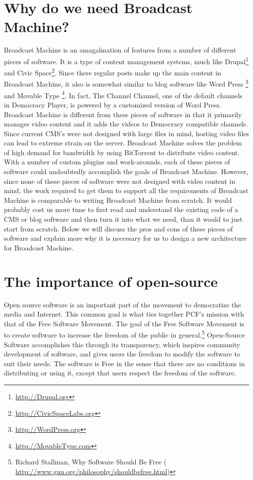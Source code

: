 \documentclass[a4paper,12pt]{report}
\begin{document}
\section {Why do we need Broadcast Machine?}
    Broadcast Machine is an amagalmation of features from a number of different pieces of software.
It is a type of content management systems, much like Drupal\footnote{\url{http://Drupal.org}} and Civic Space\footnote{\url{http://CivicSpaceLabs.org} }.
Since there regular posts make up the main content in Broadcast Machine, it also is somewhat similar to blog software like Word Press \footnote{\url{http://WordPress.org}} and Movable Type \footnote{\url{ http://MovableType.com}}.
In fact, The Channel Channel, one of the default channels in Democracy Player, is powered by a customized version of Word Press.
Broadcast Machine is different from these pieces of software in that it primarily manages video content and it adds the videos to Democracy compatible channels.
Since current CMS's were not designed with large files in mind, hosting video files can lead to extreme strain on the server.
Broadcast Machine solves the problem of high demand for bandwidth by using BitTorrent to distribute video content.
With a number of custom plugins and work-arounds, each of these pieces of software could undoubtedly accomplish the goals of Broadcast Machine.
However, since none of these pieces of software were not designed with video content in mind, the work required to get them to support all the requirements of Broadcast Machine is comparable to writing Broadcast Machine from scratch.
It would probably cost us more time to first read and understand the existing code of a CMS or blog software and then turn it into what we need, than it would to just start from scratch.
Below we will discuss the pros and cons of these pieces of software and explain more why it is neccesary for us to design a new architecture for Broadcast Machine.
	
\section {The importance of open-source}
    Open source software is an important part of the movement to democratize the media and Internet.
This common goal is what ties together PCF's mission with that of the Free Software Movement.
The goal of the Free Software Movement is to create software to increase the freedom of the public in general.\footnote{Richard Stallman, Why Software Should Be Free (\url{ http://www.gnu.org/philosophy/shouldbefree.html})}
Open-Source Software accomplishes this through its transparency, which inspires community development of software, and gives users the freedom to modify the software to suit their needs.
The software is Free in the sense that there are no conditions in distributing or using it, except that users respect the freedom of the software.
\end{document}
